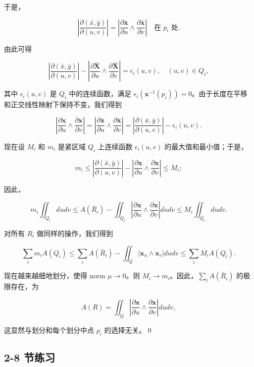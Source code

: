 \begin{Proof}
于是，

\[
\left| \frac{\partial(\bar{x}, \bar{y})}{\partial(u, v)} \right| = \left| \frac{\partial \bar{\mathbf{x}}}{\partial u} \wedge \frac{\partial \bar{\mathbf{x}}}{\partial v} \right| \quad \text{在 } p_i \text{ 处}.
\]

由此可得

\[
\left| \frac{\partial(\bar{x}, \bar{y})}{\partial(u, v)} \right| - \left| \frac{\partial \bar{\mathbf{X}}}{\partial u} \wedge \frac{\partial \bar{\mathbf{X}}}{\partial v} \right| = \epsilon_i(u, v), \quad (u, v) \in Q_i,
\]

其中 $\epsilon_i(u,v)$ 是 $Q_i$ 中的连续函数，满足 $\epsilon_i(\mathbf{x}^{-1}(p_i)) = 0$。由于长度在平移和正交线性映射下保持不变，我们得到

\[
\left| \frac{\partial \mathbf{x}}{\partial u} \wedge \frac{\partial \mathbf{x}}{\partial v} \right| = \left| \frac{\partial \bar{\mathbf{x}}}{\partial u} \wedge \frac{\partial \bar{\mathbf{x}}}{\partial v} \right| = \left| \frac{\partial(\bar{x}, \bar{y})}{\partial(u, v)} \right| - \epsilon_i(u, v).
\]

现在设 $M_i$ 和 $m_i$ 是紧区域 $Q_i$ 上连续函数 $\epsilon_i(u,v)$ 的最大值和最小值；于是，

\[
m_i \leq \left| \frac{\partial(\bar{x}, \bar{y})}{\partial(u, v)} \right| - \left| \frac{\partial \mathbf{x}}{\partial u} \wedge \frac{\partial \mathbf{x}}{\partial v} \right| \leq M_i;
\]

因此，

\[
m_i \iint_{Q_i} du dv \leq A(\bar{R}_i) - \iint_{Q_i} \left| \frac{\partial \mathbf{x}}{\partial u} \wedge \frac{\partial \mathbf{x}}{\partial v} \right| du dv \leq M_i \iint_{Q_i} du dv.
\]

对所有 $R_i$ 做同样的操作，我们得到

\[
\sum_i m_i A(Q_i) \leq \sum_i A(\bar{R}_i) - \iint_Q |\mathbf{x}_u \wedge \mathbf{x}_v| du dv \leq \sum_i M_i A(Q_i).
\]

现在越来越细地划分，使得 norm $\mu \to 0$。则 $M_i \to m_i$。因此，$\sum_i A(\bar{R}_i)$ 的极限存在，为

\[
A(R) = \iint_Q \left| \frac{\partial \mathbf{x}}{\partial u} \wedge \frac{\partial \mathbf{x}}{\partial v} \right| du dv,
\]

这显然与划分和每个划分中点 $p_i$ 的选择无关。\qed
\end{Proof}

\subsection*{2-8 节练习}


